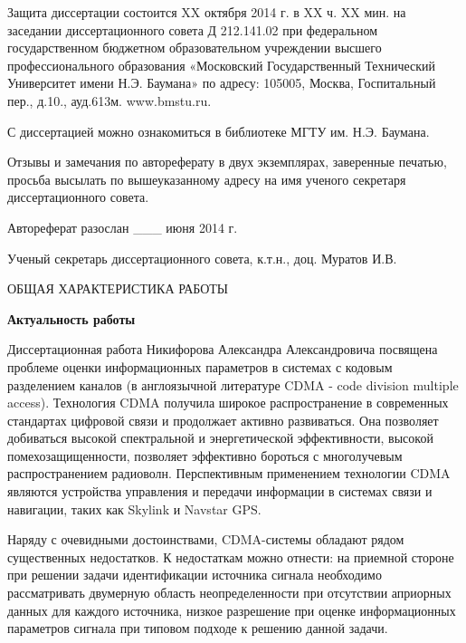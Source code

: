 \noindent
Защита диссертации состоится XX октября 2014 г. в XX ч. XX мин. на заседании диссертационного совета Д 212.141.02 при федеральном государственном бюджетном
образовательном учреждении высшего профессионального образования «Московский Государственный Технический Университет имени Н.Э. Баумана» по адресу: 105005, Москва,
Госпитальный пер., д.10., ауд.613м. www.bmstu.ru.

\noindent
С диссертацией можно ознакомиться в библиотеке МГТУ им. Н.Э. Баумана.

\noindent
Отзывы и замечания по автореферату в двух экземплярах, заверенные печатью, просьба высылать по вышеуказанному адресу на имя ученого секретаря диссертационного совета.

\noindent
Автореферат разослан \_\_\_ июня 2014 г.

\vfill
\noindent
Ученый секретарь диссертационного совета, 
к.т.н., доц. 	Муратов И.В. 

\newpage


{\bf\noindent\centerline{ОБЩАЯ ХАРАКТЕРИСТИКА РАБОТЫ}}

{\bf{Актуальность работы}}

Диссертационная работа Никифорова Александра Александровича посвящена проблеме оценки информационных параметров в системах с кодовым разделением каналов
(в англоязычной литературе CDMA - code division multiple access).
Технология CDMA получила широкое распространение в современных стандартах цифровой связи и продолжает активно развиваться. Она позволяет добиваться высокой
спектральной и энергетической эффективности, высокой помехозащищенности, позволяет эффективно бороться с многолучевым распространением радиоволн.
Перспективным применением технологии CDMA являются устройства управления и передачи информации в системах связи и навигации, таких как Skylink и Navstar GPS. 

Наряду с очевидными достоинствами, CDMA-системы обладают рядом существенных недостатков. К недостаткам можно отнести: на приемной стороне 
при решении задачи идентификации источника сигнала необходимо рассматривать
двумерную область неопределенности при отсутствии априорных данных для каждого источника, низкое разрешение при оценке информационных параметров сигнала при типовом подходе
к решению данной задачи.

